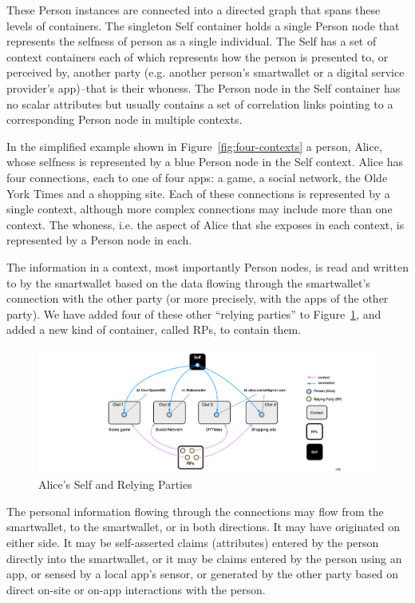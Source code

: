 \documentclass[11pt, oneside]{article}   	%
\begin{document}
These Person instances are connected into a directed graph that spans these  levels of containers. The singleton Self container holds a single Person node that represents the selfness of person as a single individual. The Self has a set of context containers each of which represents how the person is presented to, or perceived by, another party (e.g. another person's smartwallet or a digital service provider's app)--that is their whoness. The Person node in the Self container has no scalar attributes but usually contains a set of correlation links pointing to a corresponding Person node in multiple contexts.

In the simplified example shown in Figure~\ref{fig:four-contexts} a person, Alice, whose selfness is represented by a blue Person node in the Self context. Alice has four connections, each to one of four apps: a game, a social network, the Olde York Times and a shopping site. Each of these connections is represented by a single context, although more complex connections may include more than one context. The whoness, i.e. the aspect of Alice that she exposes in each context, is represented by a Person node in each.

The information in a context, most importantly Person nodes, is read and written to by the smartwallet based on the data flowing through the smartwallet's connection with the other party (or more precisely, with the apps of the other party). We have added four of these other ``relying parties'' to Figure~\ref{fig:RPs-container}, and added a new kind of container, called RPs, to contain them. 

\begin{figure}[h!]
\includegraphics[width=\textwidth]{./images/example2.png}
\caption{Alice's Self and Relying Parties}
\label{fig:RPs-container}
\end{figure}

The personal information flowing through the connections may flow from the smartwallet, to the smartwallet, or in both directions. It may have originated on either side. It may be self-asserted claims (attributes) entered by the person directly into the smartwallet, or it may be claims entered by the person using an app, or sensed by a local app's sensor, or generated by the other party based on direct on-site or on-app interactions with the person.
\end{document}
